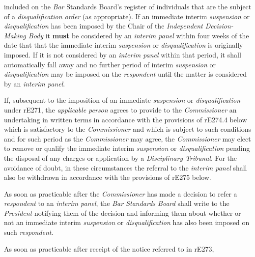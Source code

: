 included on the \emph{Bar }Standards Board's register of individuals
that are the subject of a \emph{disqualification order} (as
appropriate).\ln
{}
If an immediate interim \emph{suspension} or \emph{disqualification} has
been imposed by the Chair of the \emph{Independent Decision-Making
Body} it  \textcolor{myred}{\textbf{must}} be considered by an \emph{interim panel} within four weeks
of the date that that the immediate
interim \emph{suspension} or \emph{disqualification} is originally
imposed. If it is not considered by an \emph{interim panel} within that
period, it shall automatically fall away and no further period of
interim \emph{suspension} or \emph{disqualification} may be imposed on
the \emph{respondent} until the matter is considered by an \emph{interim
panel}.\\
\par
If, subsequent to the imposition of an
immediate \emph{suspension} or \emph{disqualification} under \textbf{ } rE271,
the \emph{applicable person} agrees to provide to
the \emph{Commissioner} an undertaking in written terms in accordance
with the provisions of rE274.4 below which is satisfactory to
the \emph{Commissioner} and which is subject to such conditions and for
such period as the \emph{Commissioner} may agree,
the \emph{Commissioner} may elect to remove or qualify the immediate
interim \emph{suspension} or \emph{disqualification} pending the
disposal of any charges or application by a \emph{Disciplinary
Tribunal}. For the avoidance of doubt, in these circumstances the
referral to the \emph{interim panel} shall also be withdrawn in
accordance with the provisions of rE275 below.\\
\par
{}
As soon as practicable after the \emph{Commissioner} has made a decision
to refer a \emph{respondent} to an \emph{interim
panel},\emph{ }the \emph{Bar Standards Board} shall write to
the \emph{President} notifying them of the decision and informing them
about whether or not an immediate
interim \emph{suspension} or \emph{disqualification} has also been
imposed on such \emph{respondent}.\\
\par
As soon as practicable after receipt of the notice referred to in rE273,
